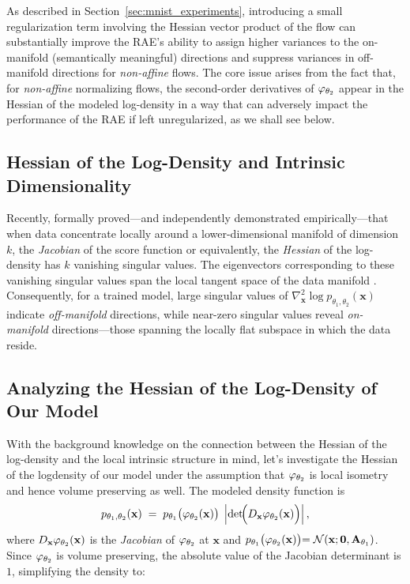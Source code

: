 As described in Section~\ref{sec:mnist_experiments}, introducing a small regularization term involving the Hessian vector product of the flow can substantially improve the RAE’s ability to assign higher variances to the on-manifold (semantically meaningful) directions and suppress variances in off-manifold directions for \textit{non-affine} flows. The core issue arises from the fact that, for \emph{non-affine} normalizing flows, the second-order derivatives of \(\varphi_{\theta_2}\) appear in the Hessian of the modeled log-density in a way that can adversely impact the performance of the RAE if left unregularized, as we shall see below.

\subsection{Hessian of the Log-Density and Intrinsic Dimensionality}
Recently, \citet{pmlr-v235-stanczuk24a} formally proved—and \citet{pmlr-v235-stanczuk24a,kadkhodaie2024generalization,wenliang2022score} independently demonstrated empirically—that when data concentrate locally around a lower-dimensional manifold of dimension \(k\), the \textit{Jacobian} of the score function or equivalently, the \textit{Hessian} of the log-density has \(k\) vanishing singular values. The eigenvectors corresponding to these vanishing singular values span the local tangent space of the data manifold \cite{pmlr-v235-stanczuk24a,kadkhodaie2024generalization,wenliang2022score}. Consequently, for a trained model, large singular values of \(\nabla_{\mathbf{x}}^2\!\log p_{\theta_1, \theta_2}(\mathbf{x})\) indicate \emph{off-manifold} directions, while near-zero singular values reveal \emph{on-manifold} directions—those spanning the locally flat subspace in which the data reside.

\subsection{Analyzing the Hessian of the Log-Density of Our Model}
With the background knowledge on the connection between the Hessian of the log-density and the local intrinsic structure in mind, let's investigate the Hessian of the logdensity of our model under the assumption that $\varphi_{\theta_2}$ is local isometry and hence volume preserving as well. The modeled density function is
\begin{equation}
\label{eq:app_flow_density}
    p_{\theta_1, \theta_2}(\mathbf{x})
    \;=\;
    p_{\theta_1}\bigl(\varphi_{\theta_2}(\mathbf{x})\bigr)
    \;\left|\det\!\Bigl(D_{\mathbf{x}}\varphi_{\theta_2}(\mathbf{x})\Bigr)\right|,
\end{equation}
where 
\(
    D_{\mathbf{x}}\varphi_{\theta_2}(\mathbf{x})
\)
is the \emph{Jacobian} of \(\varphi_{\theta_2}\) at \(\mathbf{x}\) and $p_{\theta_1}\bigl(\varphi_{\theta_2}(\mathbf{x})\bigl)=\mathcal{N}(\mathbf{x};\mathbf{0},\mathbf{A}_{\theta_1})$. Since $\varphi_{\theta_2}$ is volume preserving, the absolute value of the Jacobian determinant is $1$, simplifying the density to:


